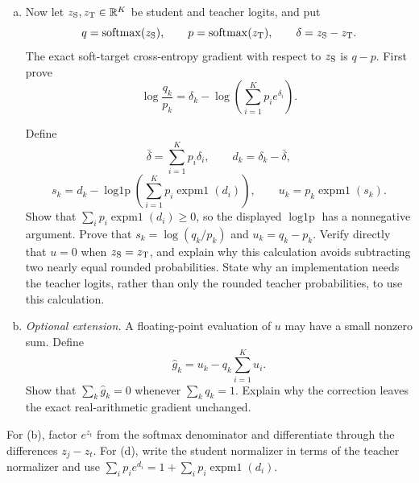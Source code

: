 \begin{exercisechunk}
\begin{enumerate}[(a),beginpenalty=10000]
\item Now let \(z_{\rm S},z_{\rm T}\in\mathbb R^K\) be student and teacher logits,
and put
\[
 q=\operatorname{softmax}(z_{\rm S}),
 \qquad p=\operatorname{softmax}(z_{\rm T}),
 \qquad \delta=z_{\rm S}-z_{\rm T}.
\]
The exact soft-target cross-entropy gradient with respect to \(z_{\rm S}\)
is \(q-p\). First prove
\[
 \log\frac{q_k}{p_k}
 =\delta_k-\log\!\left(\sum_{i=1}^Kp_i e^{\delta_i}\right).
\]
\par\noindent
Define
\[
 \bar\delta=\sum_{i=1}^Kp_i\delta_i,
 \qquad d_k=\delta_k-\bar\delta,
\]
\[
 s_k=d_k-
 \operatorname{log1p}\!\left(
   \sum_{i=1}^Kp_i\operatorname{expm1}(d_i)
 \right),
 \qquad
 u_k=p_k\operatorname{expm1}(s_k).
\]
Show that
\(\sum_i p_i\operatorname{expm1}(d_i)\ge0\), so the displayed
\(\operatorname{log1p}\) has a nonnegative argument.
Prove that \(s_k=\log(q_k/p_k)\) and \(u_k=q_k-p_k\). Verify directly
that \(u=0\) when \(z_{\rm S}=z_{\rm T}\), and explain why this calculation
avoids subtracting two nearly equal rounded probabilities. State why an
implementation needs the teacher logits, rather than only the rounded teacher
probabilities, to use this calculation.

\item \emph{Optional extension.} A floating-point evaluation of \(u\) may
have a small nonzero sum. Define
\[
 \widehat g_k=u_k-q_k\sum_{i=1}^K u_i.
\]
Show that \(\sum_k\widehat g_k=0\) whenever \(\sum_kq_k=1\). Explain why
the correction leaves the exact real-arithmetic gradient unchanged.
\end{enumerate}

\begin{hints}
For (b), factor \(e^{z_t}\) from the softmax denominator and differentiate
through the differences \(z_j-z_t\). For (d), write the student normalizer in
terms of the teacher normalizer and use
\(\sum_i p_i e^{d_i}=1+\sum_i p_i\operatorname{expm1}(d_i)\).
\end{hints}
\end{exercisechunk}

